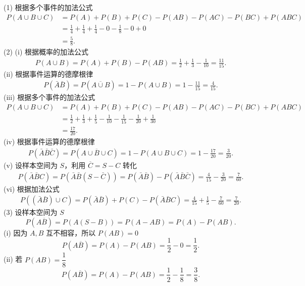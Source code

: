 \begin{solution}
    (1) 根据多个事件的加法公式
    $$
        \begin{aligned}
            P(A \cup B \cup C)
             & = P(A) + P(B) + P(C) - P(AB) - P(AC) - P(BC) + P(ABC)              \\
             & = \frac{1}{4} + \frac{1}{4} + \frac{1}{4}- 0 - \frac{1}{8} - 0 + 0 \\
             & = \frac{5}{8}.
        \end{aligned}
    $$
    (2) (i) 根据概率的加法公式
    $$
        \begin{aligned}
            P(A \cup B)
            = P(A) + P(B) - P(AB)
            = \frac{1}{2} + \frac{1}{3} - \frac{1}{10}
            = \frac{11}{15}.
        \end{aligned}
    $$
    (ii) 根据事件运算的德摩根律
    $$
        \begin{aligned}
            P\left(\bar{A}\bar{B}\right)
            = P\left(\overline{A \cup B}\right) = 1-P(A \cup B)
            = 1-\frac{11}{15} = \frac{4}{15}.
        \end{aligned}
    $$
    (iii) 根据多个事件的加法公式
    $$
        \begin{aligned}
            P(A \cup B \cup C)
             & = P(A) + P(B) + P(C) - P(AB) - P(AC) - P(BC) + P(ABC)                                             \\
             & = \frac{1}{2} + \frac{1}{3} + \frac{1}{5} - \frac{1}{10}-\frac{1}{15}-\frac{1}{20} + \frac{1}{30} \\
             & = \frac{17}{20}.
        \end{aligned}
    $$
    (iv) 根据事件运算的德摩根律
    $$
        \begin{aligned}
            P\left(\bar{A}\bar{B}\bar{C}\right)
            = P\left(\overline{A \cup B \cup C}\right)
            = 1 - P(A \cup B \cup C)
            = 1 - \frac{17}{20}
            = \frac{3}{20}.
        \end{aligned}
    $$
    (v) 设样本空间为 $S$，利用 $\overline{C} = S - C$ 转化
    $$
        \begin{aligned}
            P(\bar{A}\bar{B}C)
            = P\left(\bar{A}\bar{B}(S-\bar{C})\right)
            = P\left(\bar{A}\bar{B}\right) - P\left(\bar{A}\bar{B}\bar{C}\right)
            = \frac{4}{15} - \frac{3}{20}
            = \frac{7}{60}.
        \end{aligned}
    $$
    (vi) 根据加法公式
    $$
        \begin{aligned}
            P\left( (\bar{A}\bar{B})\cup C \right)
            = P(\bar{A}\bar{B}) + P(C) - P(\bar{A}\bar{B}C)
            = \frac{4}{15} + \frac{1}{5} - \frac{7}{60}
            = \frac{7}{20}.
        \end{aligned}
    $$
    (3) 设样本空间为 $S$
    $$
        P(A\overline{B}) = P(A(S-B)) = P(A - AB) = P(A) - P(AB).
    $$
    (i) 因为 $A,B$ 互不相容，所以 $P(AB) = 0$
    $$
        P(A\overline{B}) = P(A) - P(AB) = \frac{1}{2} - 0 = \frac{1}{2}.
    $$
    (ii) 若 $P(AB) = \dfrac{1}{8}$
    $$
        P(A\overline{B})
        = P(A)-P(AB)
        = \frac{1}{2}-\frac{1}{8}
        = \frac{3}{8}.
    $$
\end{solution}


